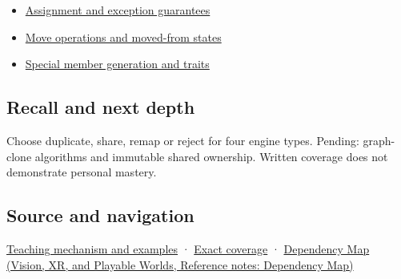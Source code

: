 \hypertarget{appendix-1340cd1ce582-used-by}{}

\begin{itemize}
\tightlist
\item
  \hyperref[appendix-bea6beb5350f]{Assignment and exception guarantees}
\item
  \hyperref[appendix-5636651017c2]{Move operations and moved-from states}
\item
  \hyperref[appendix-42e02a12c694]{Special member generation and traits}
\end{itemize}

\subsection{Recall and next depth}\label{appendix-1340cd1ce582-recall-and-next-depth}

\hypertarget{appendix-1340cd1ce582-recall-and-next-depth}{}

Choose duplicate, share, remap or reject for four engine types. Pending: graph-clone algorithms and immutable shared ownership. Written coverage does not demonstrate personal mastery.

\subsection{Source and navigation}\label{appendix-1340cd1ce582-source-and-navigation}

\hypertarget{appendix-1340cd1ce582-source-and-navigation}{}

\hyperref[01-foundations-i-ch003-copy-a-meaning-rather-than-just-its-bytes]{Teaching mechanism and examples} · \hyperref[appendix-fd090d982a15-m009---parts-127-147]{Exact coverage} · \href{../07-Vision-XR-and-Playable-Worlds/main.pdf\#nameddest=appendix-4ad47bdd269a}{Dependency Map (Vision, XR, and Playable Worlds, Reference notes: Dependency Map)}
